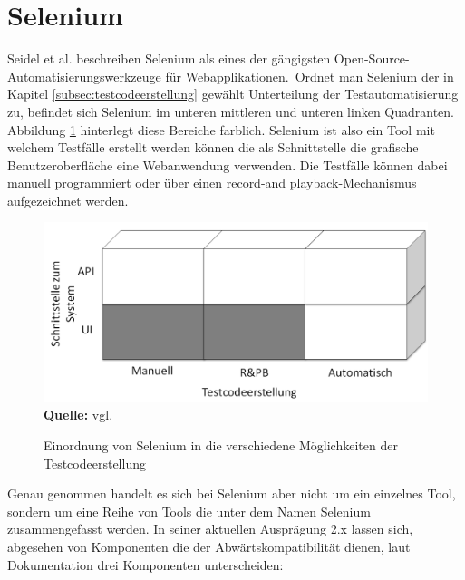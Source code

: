 \section{Selenium}
\label{sec:selenium}
Seidel et al. \cite[S. 142]{seidl_basiswissen_2012} beschreiben Selenium als \glqq eines der gängigsten Open-Source-Automatisierungswerkzeuge für Webapplikationen.\grqq\
Ordnet man Selenium der in Kapitel \ref{subsec:testcodeerstellung} gewählt Unterteilung der Testautomatisierung zu, befindet sich Selenium im unteren mittleren und unteren linken Quadranten. Abbildung \ref{fig:bereicheTestcodeerstellungSelenium} hinterlegt diese Bereiche farblich.
Selenium ist also ein Tool mit welchem Testfälle erstellt werden können die als Schnittstelle die grafische Benutzeroberfläche eine Webanwendung verwenden. Die Testfälle können dabei manuell programmiert oder über einen \grq record-and playback\grq -Mechanismus aufgezeichnet werden.
\begin{figure}[htb]
  \centering  
  \includegraphics[scale=0.7]{img/bereicheTestcodeerstellungSelenium.png}\\
  \footnotesize\sffamily\textbf{Quelle:} vgl. \cite{meszaros_agile_2003}
  \caption{Einordnung von Selenium in die verschiedene Möglichkeiten der Testcodeerstellung}
  \label{fig:bereicheTestcodeerstellungSelenium}
\end{figure}
Genau genommen handelt es sich bei Selenium aber nicht um ein einzelnes Tool, sondern um eine Reihe von Tools die unter dem Namen Selenium zusammengefasst werden.
In seiner aktuellen Ausprägung 2.x lassen sich, abgesehen von Komponenten die der Abwärtskompatibilität dienen, laut Dokumentation \cite{selenium_selenium_2015-1} drei Komponenten unterscheiden:

